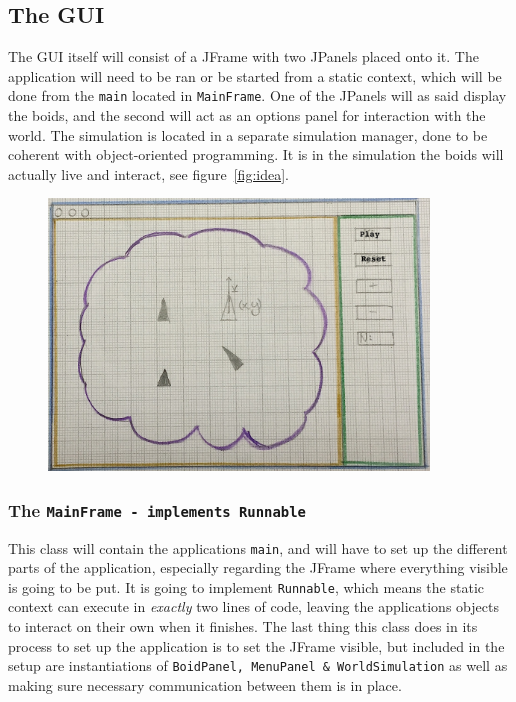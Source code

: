 \documentclass[a4paper,twoside, 10pt]{report}
\newcommand{\code}[1]{\texttt{#1}}
\begin{document}
\begin{minipage}[T]{0.3\textwidth}
  \subsection{The GUI}
  \label{subsec:GUI}
  The GUI itself will consist of a JFrame with two JPanels placed onto it. The application will need to be ran or be started from a static context, which will be done from the \code{main} located in \code{MainFrame}. One of the JPanels will as said display the boids, and the second will act as an options panel for interaction with the world. The simulation is located in a separate simulation manager, done to be coherent with object-oriented programming. It is in the simulation the boids will actually live and interact, see figure~\ref{fig:idea}.
\end{minipage}
%
\begin{minipage}[C]{0.70\textwidth}
  \captionsetup{type=figure}
  \begin{figure}[H]
    \hfill
    \includegraphics[width = 0.9\textwidth]{images/IdeaSketch.jpg}
  \end{figure}  
  \caption{Initial Sketch of GUI, World, Boids and ``Tools''}
  \label{fig:idea}
  \abovecaptionskip
  \belowcaptionskip
\end{minipage}

\subsubsection{The \code{MainFrame - implements Runnable}}
\label{subsubsec:MainFrame}
This class will contain the applications \code{main}, and will have to set up the different parts of the application, especially regarding the JFrame where everything visible is going to be put. It is going to implement \code{Runnable}, which means the static context can execute in \textit{exactly} two lines of code, leaving the applications objects to interact on their own when it finishes. The last thing this class does in its process to set up the application is to set the JFrame visible, but included in the setup are instantiations of \code{BoidPanel, MenuPanel \& WorldSimulation} as well as making sure necessary communication between them is in place. 
\end{document}
